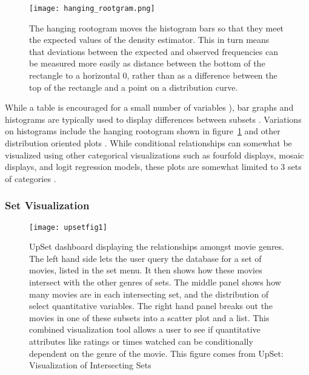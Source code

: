 \documentclass[../main.tex]{subfiles}
\begin{document}
\begin{figure}
\texttt{[image: hanging\_rootgram.png]}
\caption{The hanging rootogram moves the histogram bars so that they meet the expected values of the density estimator. This in turn means that deviations between the expected and observed frequencies can be measured more easily as distance between the bottom of the rectangle to a horizontal 0, rather than as a difference between the top of the rectangle and a point on a distribution curve.}
\label{fig:hanging_rootogram}
\end{figure}

 While a table is encouraged for a small number of variables
 \cite{munzner_what_2014}), bar graphs and histograms are typically used to display differences between subsets \cite{ioannidis_history_2003-1, friendly_brief_2006}. Variations on histograms  include the hanging rootogram shown in figure~\ref{fig:hanging_rootogram} and other distribution oriented plots \cite{tukey_exploratory_1977, friendly_visualizing_2000}. While conditional relationships can somewhat be visualized using other categorical visualizations such as fourfold displays, mosaic displays, and logit regression models, these plots are somewhat limited to 3 sets of categories
 \cite{friendly_visualizing_2000}. 
   
 \subsubsection{Set Visualization}
\begin{figure}
  \texttt{[image: upsetfig1]}
   \caption{UpSet dashboard displaying the relationships amongst movie genres. The left hand side lets the user query the database for a set of movies, listed in the set menu. It then shows how these movies intersect with the other genres of sets. The middle panel shows how many movies are in each intersecting set, and the distribution of select quantitative variables. The right hand panel breaks out the movies in one of these subsets into a scatter plot and a list. This combined visualization tool allows a user to see if quantitative attributes like ratings or times watched can be conditionally dependent on the genre of the movie. This figure comes from UpSet: Visualization of Intersecting Sets \cite{lex_upset_2014}}
   \label{fig:upsetfig}
\end{figure}
\end{document}
